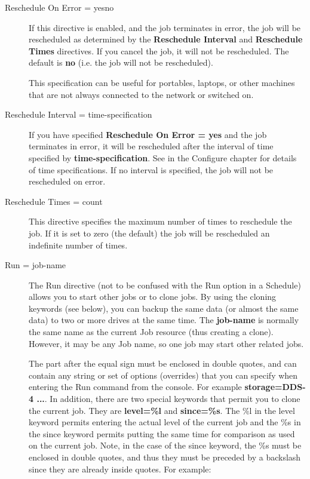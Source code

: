 \begin{description}
\item [Reschedule On Error = \lt{}yes\vb{}no\gt{}]
   If this directive is enabled, and the job terminates in error, the job
   will be rescheduled as determined by the {\bf Reschedule Interval} and
   {\bf Reschedule Times} directives.  If you cancel the job, it will not
   be rescheduled.  The default is {\bf no} (i.e.  the job will not be
   rescheduled).

   This specification can be useful for portables, laptops, or other
   machines that are not always connected to the network or switched on.

\item [Reschedule Interval = \lt{}time-specification\gt{}]
   If you have specified {\bf Reschedule On Error = yes} and the job
   terminates in error, it will be rescheduled after the interval of time
   specified by {\bf time-specification}.  See  in the Configure chapter for details of
   time specifications.  If no interval is specified, the job will not be
   rescheduled on error.

\item [Reschedule Times = \lt{}count\gt{}]
   This directive specifies the maximum number of times to reschedule the
   job.  If it is set to zero (the default) the job will be rescheduled an
   indefinite number of times.

\item [Run = \lt{}job-name\gt{}]
   The Run directive (not to be confused with the Run option in a 
   Schedule) allows you to start other jobs or to clone jobs. By using the
   cloning keywords (see below), you can backup
   the same data (or almost the same data) to two or more drives
   at the same time. The {\bf job-name} is normally the same name
   as the current Job resource (thus creating a clone). However, it
   may be any Job name, so one job may start other related jobs.

   The part after the equal sign must be enclosed in double quotes,
   and can contain any string or set of options (overrides) that you
   can specify when entering the Run command from the console. For
   example {\bf storage=DDS-4 ...}.  In addition, there are two special
   keywords that permit you to clone the current job. They are {\bf level=\%l}
   and {\bf since=\%s}. The \%l in the level keyword permits 
   entering the actual level of the current job and the \%s in the since
   keyword permits putting the same time for comparison as used on the
   current job.  Note, in the case of the since keyword, the \%s must be
   enclosed in double quotes, and thus they must be preceded by a backslash
   since they are already inside quotes. For example:


\end{description}
